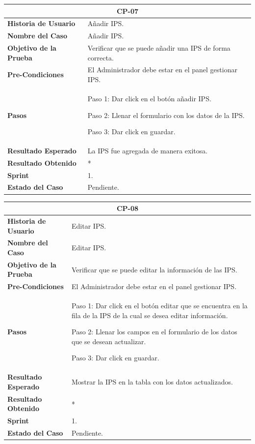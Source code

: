 \documentclass[12pt,a4paper]{article}
\begin{document}
\begin{center}
\begin{tabular}{|m{5cm}|m{9cm}|}
\hline
\multicolumn{2}{|c|}{\textbf{CP-07}} \\
\hline
\textbf{Historia de Usuario} & Añadir IPS. \\
\hline
\textbf{Nombre del Caso} & Añadir IPS. \\
\hline
\textbf{Objetivo de la Prueba} & Verificar que se puede añadir una IPS de forma correcta. \\
\hline
\textbf{Pre-Condiciones} & El Administrador debe estar en el panel gestionar IPS. \\
\hline
\textbf{Pasos} & Paso 1: Dar click en el botón añadir IPS.

Paso 2: Llenar el formulario con los datos de la IPS.

Paso 3: Dar click en guardar. \\
\hline
\textbf{Resultado Esperado} & La IPS fue agregada de manera exitosa. \\
\hline
\textbf{Resultado Obtenido} & * \\
\hline
\textbf{Sprint} & 1. \\
\hline
\textbf{Estado del Caso} & Pendiente. \\
\hline
\end{tabular}
\vspace{5mm}

\begin{tabular}{|m{5cm}|m{9cm}|}
\hline
\multicolumn{2}{|c|}{\textbf{CP-08}} \\
\hline
\textbf{Historia de Usuario} & Editar IPS. \\
\hline
\textbf{Nombre del Caso} & Editar IPS. \\
\hline
\textbf{Objetivo de la Prueba} & Verificar que se puede editar la información de las IPS. \\
\hline
\textbf{Pre-Condiciones} & El Administrador debe estar en el panel gestionar IPS. \\
\hline
\textbf{Pasos} & Paso 1: Dar click en el botón editar que se encuentra en la fila de la IPS de la cual se desea editar información.

Paso 2: Llenar los campos en el formulario de los datos que se desean actualizar.

Paso 3: Dar click en guardar.\\
\hline
\textbf{Resultado Esperado} & Mostrar la IPS en la tabla con los datos actualizados. \\
\hline
\textbf{Resultado Obtenido} & * \\
\hline
\textbf{Sprint} & 1. \\
\hline
\textbf{Estado del Caso} & Pendiente. \\
\hline
\end{tabular}
\vspace{5mm}


\end{center}
\end{document}
